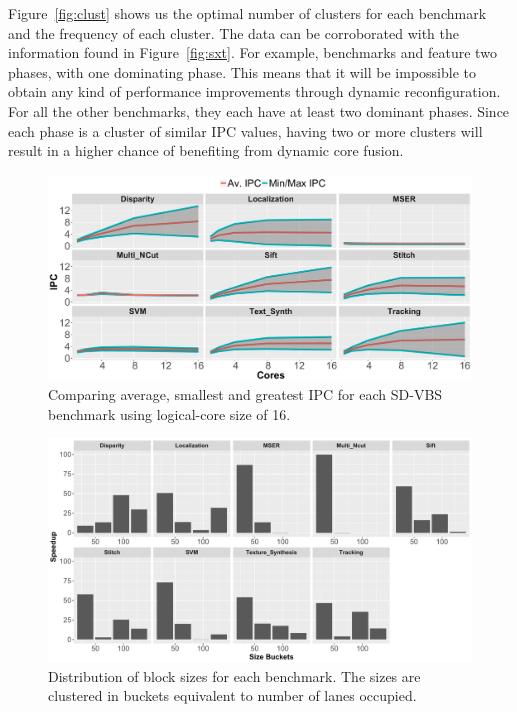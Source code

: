 Figure~\ref{fig:clust} shows us the optimal number of clusters for each benchmark and the frequency of each cluster.
The data can be corroborated with the information found in Figure~\ref{fig:sxt}.
For example, benchmarks  and  feature two phases, with one dominating phase.
This means that it will be impossible to obtain any kind of performance improvements through dynamic reconfiguration.
For all the other benchmarks, they each have at least two dominant phases.
Since each phase is a cluster of similar IPC values, having two or more clusters will result in a higher chance of benefiting from dynamic core fusion.


\begin{figure}
    \centering
    \includegraphics[width=1\textwidth]{cases-paper/graphics/Exploration/stddev2.pdf}
    \caption{Comparing average, smallest and greatest IPC for each SD-VBS benchmark using logical-core size of 16.}
    \label{fig:stddev}
		\vspace{5mm}
\end{figure}

\begin{figure}[t]
    \centering
    \includegraphics[width=1\textwidth]{cases-paper/graphics/Exploration/SizeBuckets.pdf}
    \caption{Distribution of block sizes for each benchmark. The sizes are clustered in buckets equivalent to number of lanes occupied.}
    \label{fig:block_sizes}
	\vspace{5mm}
\end{figure}

